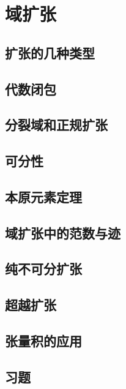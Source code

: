 \chapter{域扩张}

\section{扩张的几种类型}
\section{代数闭包}
\section{分裂域和正规扩张}
\section{可分性}
\section{本原元素定理}
\section{域扩张中的范数与迹}
\section{纯不可分扩张}
\section{超越扩张}
\section{张量积的应用}
\section{习题}